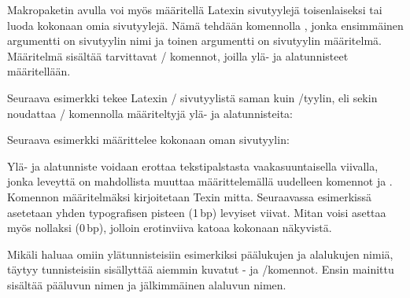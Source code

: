\begin{koodilohkosis}
\fancyhf[FC]{-- \thepage\ --}
\end{koodilohkosis}

Makropaketin  avulla voi myös määritellä Latexin
sivutyylejä toisenlaiseksi tai luoda kokonaan omia sivutyylejä. Nämä
tehdään komennolla , jonka ensimmäinen
argumentti on sivutyylin nimi ja toinen argumentti on sivutyylin
määritelmä. Määritelmä sisältää tarvittavat \-/
komennot, joilla ylä- ja alatunnisteet määritellään.

Seuraava esimerkki tekee Latexin \-/ sivutyylistä saman
kuin \-/tyylin, eli sekin noudattaa \-/
komennolla määriteltyjä ylä- ja alatunnisteita:

\begin{koodilohkosis}
\end{koodilohkosis}

Seuraava esimerkki määrittelee kokonaan oman sivutyylin:

\begin{koodilohkosis}
\end{koodilohkosis}

Ylä- ja alatunniste voidaan erottaa tekstipalstasta vaakasuuntaisella
viivalla, jonka leveyttä on mahdollista muuttaa määrittelemällä
uudelleen komennot  ja .
Komennon määritelmäksi kirjoitetaan Texin mitta. Seuraavassa esimerkissä
asetetaan yhden typografisen pisteen (1\,bp) levyiset viivat. Mitan
voisi asettaa myös nollaksi (0\,bp), jolloin erotinviiva katoaa kokonaan
näkyvistä.

\begin{koodilohkosis}
\renewcommand{\headrulewidth}{1bp} %
\renewcommand{\footrulewidth}{1bp} %
\end{koodilohkosis}

Mikäli haluaa omiin ylätunnisteisiin esimerkiksi päälukujen ja
alalukujen nimiä, täytyy tunnisteisiin sisällyttää aiemmin kuvatut
- ja \-/komennot. Ensin mainittu
sisältää pääluvun nimen ja jälkimmäinen alaluvun nimen.

